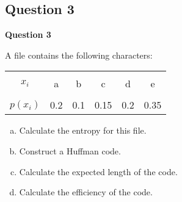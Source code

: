 \documentclass[compress]{beamer}        %
\makeatletter
\newcommand{\tcb}{\textcolor{beamer@blendedblue}}
\makeatother
\begin{document}
\subsection{Question 3}
\begin{frame}{\bf \tcb{Question 3}}

A file contains the following characters:\\
\begin{center}
\begin{tabular}{|c|ccccc|}
\hline
&&&&& \\[-0.4cm]
$x_i$     & a & b & c & d & e \\[0.1cm]
\hline
&&&&& \\[-0.4cm]
$p(x_i)$  & 0.2 & 0.1 & 0.15 & 0.2 & 0.35 \\[0.1cm]
\hline
\end{tabular}
\end{center}

\begin{enumerate}[a)]\itemsep0.4cm
\item Calculate the entropy for this file.
\item Construct a Huffman code.
\item Calculate the expected length of the code.
\item Calculate the efficiency of the code.
\end{enumerate}


\end{frame}
\end{document}
